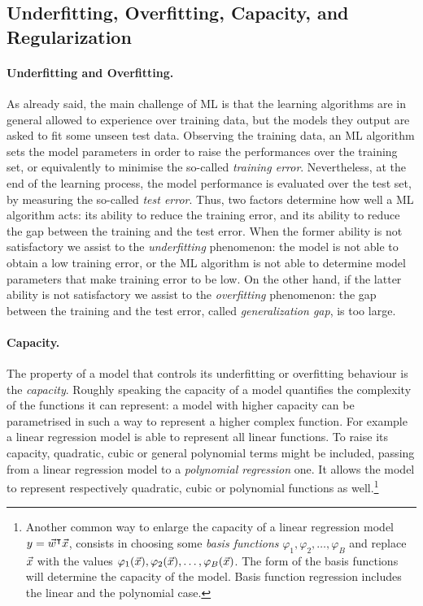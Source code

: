 \subsection{Underfitting, Overfitting, Capacity,  and Regularization}\label{sec:overfitting}
\paragraph*{Underfitting and Overfitting.} As already said, the main challenge of ML is that the learning algorithms are in general allowed to experience over training data, but the models they output are asked to fit some unseen test data. Observing the training data, an ML algorithm sets the model parameters in order to raise the performances over the training set, or equivalently to minimise the so-called \textit{training error}. Nevertheless, at the end of the learning process, the model performance is evaluated over the test set, by measuring the so-called \textit{test error}. Thus, two factors determine how well a ML algorithm acts: its ability to reduce the training error, and its ability to reduce the gap between the training and the test error. When the former ability is not satisfactory we assist to the \emph{underfitting} phenomenon: the model is not able to obtain a low training error, or the ML algorithm is not able to determine model parameters that make training error to be low. On the other hand, if the latter ability is not satisfactory we assist to the \emph{overfitting} phenomenon: the gap between the training and the test error, called \emph{generalization gap}, is too large. \\

\paragraph*{Capacity.}The property of a model that controls its underfitting or overfitting behaviour is the \emph{capacity}. Roughly speaking the capacity of a model quantifies the complexity of the functions it can represent: a model with higher capacity can be parametrised in such a way to represent a higher complex function. For example a linear regression model is able to represent all linear functions. To raise its capacity, quadratic, cubic or general polynomial terms might be included, passing from a linear regression model to a \emph{polynomial regression} one. It allows the model to represent respectively quadratic, cubic or polynomial functions as well.\footnote{Another common way to enlarge the capacity of a linear regression model $y = \vec{w}^\intercal \vec{x}$,  consists in choosing some \emph{basis functions} $\varphi_1, \varphi_2,\dots, \varphi_B$ and replace $\vec{x}$ with the values $\varphi_1(\vec{x}), \varphi_2(\vec{x}),\dots, \varphi_B(\vec{x})$. The form of the basis functions will determine the capacity of the model. Basis function regression includes the linear and the polynomial case.} \\

